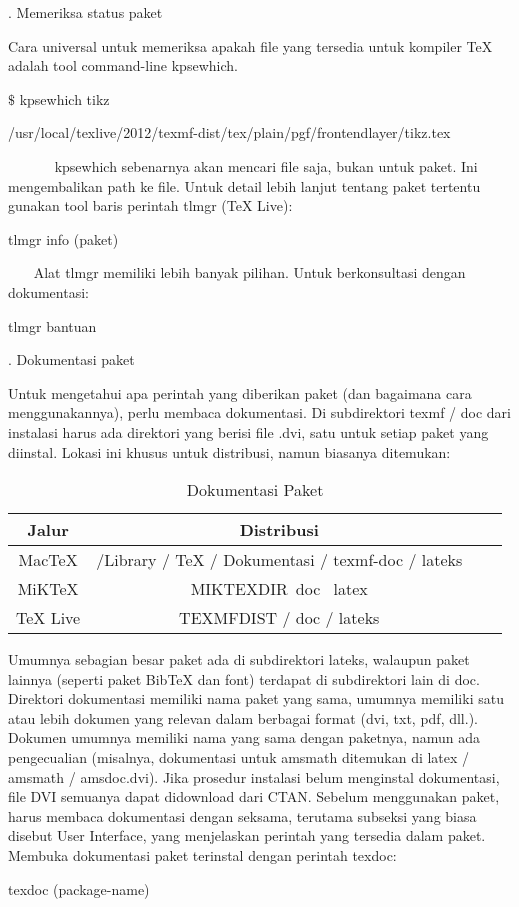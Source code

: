 \vspace{12pt}
. Memeriksa status paket\par
Cara universal untuk memeriksa apakah file yang tersedia untuk kompiler TeX adalah tool command-line kpsewhich.\par 

$\$$  kpsewhich tikz \par
/usr/local/texlive/2012/texmf-dist/tex/plain/pgf/frontendlayer/tikz.tex \par

\vspace{12pt}
~~~~~~ kpsewhich sebenarnya akan mencari file saja, bukan untuk paket. Ini mengembalikan path ke file. Untuk detail lebih lanjut tentang paket tertentu gunakan tool baris perintah tlmgr (TeX Live): \par
tlmgr info (paket)\par

\vspace{12pt}
~~~ Alat tlmgr memiliki lebih banyak pilihan. Untuk berkonsultasi dengan dokumentasi: \par
tlmgr bantuan\par

\vspace{12pt}
. Dokumentasi paket \par
Untuk mengetahui apa perintah yang diberikan paket (dan bagaimana cara menggunakannya), perlu membaca dokumentasi. Di subdirektori texmf / doc dari instalasi harus ada direktori yang berisi file .dvi, satu untuk setiap paket yang diinstal. Lokasi ini khusus untuk distribusi, namun biasanya ditemukan:\par

\begin{table}[ht]
	\caption{Dokumentasi Paket}
	\centering
	\begin{tabular}{cccc}
		\hline
		Jalur&Distribusi\\
		\hline
		MacTeX &/Library / TeX / Dokumentasi / texmf-doc / lateks&\\
		MiKTeX&MIKTEXDIR\ doc \ latex&\\
		TeX Live&TEXMFDIST / doc / lateks&\\
		\hline
	\end{tabular}
\end{table}

Umumnya sebagian besar paket ada di subdirektori lateks, walaupun paket lainnya (seperti paket BibTeX dan font) terdapat di subdirektori lain di doc. Direktori dokumentasi memiliki nama paket yang sama, umumnya memiliki satu atau lebih dokumen yang relevan dalam berbagai format (dvi, txt, pdf, dll.). Dokumen umumnya memiliki nama yang sama dengan paketnya, namun ada pengecualian (misalnya, dokumentasi untuk amsmath ditemukan di latex / amsmath / amsdoc.dvi). Jika prosedur instalasi belum menginstal dokumentasi, file DVI semuanya dapat didownload dari CTAN. Sebelum menggunakan paket, harus membaca dokumentasi dengan seksama, terutama subseksi yang biasa disebut User Interface, yang menjelaskan perintah yang tersedia dalam paket. Membuka dokumentasi paket terinstal dengan perintah texdoc: \par
texdoc (package-name)\par

